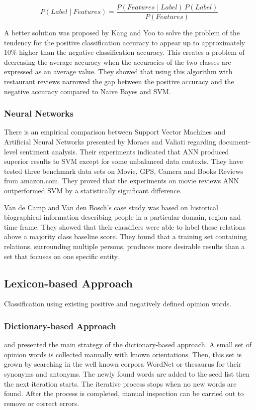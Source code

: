 $$ P(Label \mid Features) = \frac{P(Features \mid Label) \, P(Label)}{P(Features)} $$

 A better solution was proposed by Kang and Yoo \cite{kang2012senti} to solve the problem of the tendency for the positive classification accuracy to appear up to approximately 10\% higher than the negative classification accuracy. This creates a problem of decreasing the average accuracy when the accuracies of the two classes are expressed as an average value. They showed that using this algorithm with restaurant reviews narrowed the gap between the positive accuracy and the negative accuracy compared to Naive Bayes and SVM.

\subsubsection{Neural Networks}
There is an empirical comparison between Support Vector Machines and Artificial Neural Networks presented by Moraes and Valiati \cite{moraes2013document} regarding document-level sentiment analysis. Their experiments indicated that ANN produced superior results to SVM except for some unbalanced data contexts. They have tested three benchmark data sets on Movie, GPS, Camera and Books Reviews from amazon.com. They proved that the experiments on movie reviews ANN outperformed SVM by a statistically significant difference.

Van de Camp and Van den Bosch's \cite{van2012socialist} case study was based on historical biographical information describing people in a particular domain, region and time frame. They showed that their classifiers were able to label these relations above a majority class baseline score. They found that a training set containing relations, surrounding multiple persons, produces more desirable results than a set that focuses on one specific entity. 


\subsection{Lexicon-based Approach}
Classification using existing positive and negatively defined opinion words.

\subsubsection{Dictionary-based Approach}
\cite{hu2004mining} and \cite{kim2004determining} presented the main strategy of the dictionary-based approach. A small set of opinion words is collected manually with known orientations. Then, this set is grown by searching in the well known corpora WordNet \cite{miller1990introduction} or thesaurus \cite{mohammad2009generating} for their synonyms and antonyms. The newly found words are added to the seed list then the next iteration starts. The iterative process stops when no new words are found. After the process is completed, manual inspection can be carried out to remove or correct errors.

